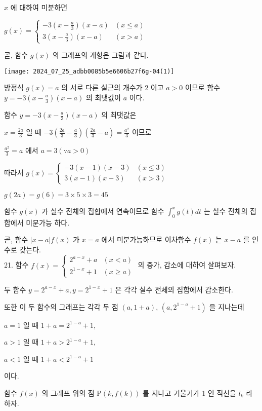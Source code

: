 \documentclass[10pt]{article}
\begin{document}
$x$ 에 대하여 미분하면

$g(x)= \begin{cases}-3\left(x-\frac{a}{3}\right)(x-a) & (x \leq a) \\ 3\left(x-\frac{a}{3}\right)(x-a) & (x>a)\end{cases}$

곧, 함수 $g(x)$ 의 그래프의 개형은 그림과 같다.

\begin{center}
\texttt{[image: 2024\_07\_25\_adbb0085b5e6606b27f6g-04(1)]}
\end{center}

방정식 $g(x)=a$ 의 서로 다른 실근의 개수가 2 이고 $a>0$ 이므로 함수 $y=-3\left(x-\frac{a}{3}\right)(x-a)$ 의 최댓값이 $a$ 이다.

함수 $y=-3\left(x-\frac{a}{3}\right)(x-a)$ 의 최댓값은

$x=\frac{2 a}{3}$ 일 때 $-3\left(\frac{2 a}{3}-\frac{a}{3}\right)\left(\frac{2 a}{3}-a\right)=\frac{a^{2}}{3}$ 이므로

$\frac{a^{2}}{3}=a$ 에서 $a=3(\because a>0)$

따라서 $g(x)= \begin{cases}-3(x-1)(x-3) & (x \leq 3) \\ 3(x-1)(x-3) & (x>3)\end{cases}$

$g(2 a)=g(6)=3 \times 5 \times 3=45$

함수 $g(x)$ 가 실수 전체의 집합에서 연속이므로 함수 $\int_{0}^{x} g(t) d t$ 는 실수 전체의 집합에서 미분가능 하다.

곧, 함수 $|x-a| f(x)$ 가 $x=a$ 에서 미분가능하므로 이차함수 $f(x)$ 는 $x-a$ 를 인수로 갖는다.\\
21. 함수 $f(x)=\left\{\begin{array}{ll}2^{a-x}+a & (x<a) \\ 2^{1-x}+1 & (x \geq a)\end{array}\right.$ 의 증가, 감소에 대하여 살펴보자.

두 함수 $y=2^{a-x}+a, y=2^{1-x}+1$ 은 각각 실수 전체의 집합에서 감소한다.

또한 이 두 함수의 그래프는 각각 두 점 $(a, 1+a)$, $\left(a, 2^{1-a}+1\right)$ 을 지나는데

$a=1$ 일 때 $1+a=2^{1-a}+1$,

$a>1$ 일 때 $1+a>2^{1-a}+1$,

$a<1$ 일 때 $1+a<2^{1-a}+1$

이다.

함수 $f(x)$ 의 그래프 위의 점 $\mathrm{P}(k, f(k))$ 를 지나고 기울기가 1 인 직선을 $l_{k}$ 라 하자.
\end{document}
